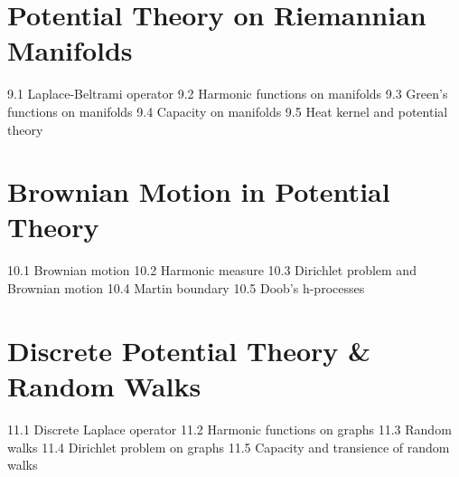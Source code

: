 \section{Potential Theory on Riemannian Manifolds}
9.1 Laplace-Beltrami operator
9.2 Harmonic functions on manifolds
9.3 Green's functions on manifolds
9.4 Capacity on manifolds
9.5 Heat kernel and potential theory
\section{Brownian Motion in Potential Theory}
10.1 Brownian motion
10.2 Harmonic measure
10.3 Dirichlet problem and Brownian motion
10.4 Martin boundary
10.5 Doob's h-processes
\section{Discrete Potential Theory \& Random Walks}
11.1 Discrete Laplace operator
11.2 Harmonic functions on graphs
11.3 Random walks
11.4 Dirichlet problem on graphs
11.5 Capacity and transience of random walks
